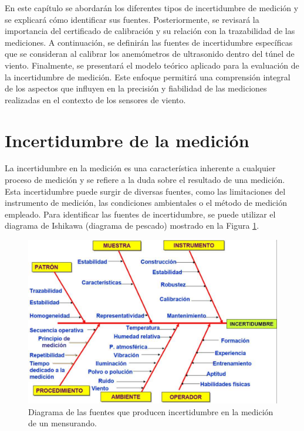En este capítulo se abordarán los diferentes tipos de incertidumbre de medición y se explicará cómo identificar sus fuentes. Posteriormente, se revisará la importancia del certificado de calibración y su relación con la trazabilidad de las mediciones. A continuación, se definirán las fuentes de incertidumbre específicas que se consideran al calibrar los anemómetros de ultrasonido dentro del túnel de viento. Finalmente, se presentará el modelo teórico aplicado para la evaluación de la incertidumbre de medición. Este enfoque permitirá una comprensión integral de los aspectos que influyen en la precisión y fiabilidad de las mediciones realizadas en el contexto de los sensores de viento.

\section{Incertidumbre de la medición}\label{sec:tipos_incertidumbre}

La incertidumbre en la medición es una característica inherente a cualquier proceso de medición y se refiere a la duda sobre el resultado de una medición. Esta incertidumbre puede surgir de diversas fuentes, como las limitaciones del instrumento de medición, las condiciones ambientales o el método de medición empleado. Para identificar las fuentes de incertidumbre, se puede utilizar el diagrama de Ishikawa (diagrama de pescado) mostrado en la Figura \ref{fig:diagramaPescado}.

\begin{figure}[H]
    \centering
    \includegraphics[width=0.8\linewidth]{Figuras/calculoIncertidumbre/diagramaPescado.png}
    \caption{Diagrama de las fuentes que producen incertidumbre en la medición de un mensurando. \cite{instrumentosMedicionesFiuba}}
    \label{fig:diagramaPescado}
\end{figure}

